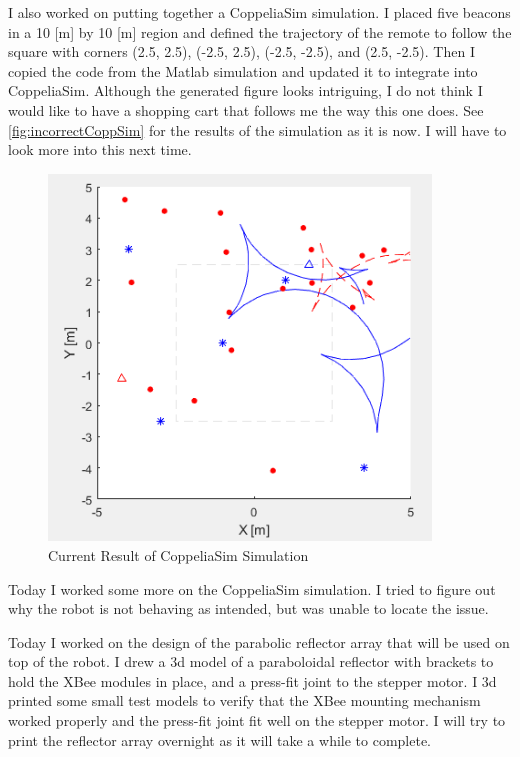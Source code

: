 \documentclass[fontsize=11pt, %
                             paper=letter, %
                             openany, %
                             captions=tableheading,
                             index=totoc,
                             hyperref]{labbook}
\begin{document}
\begin{addmargin}[0cm]{0cm}
I also worked on putting together a CoppeliaSim simulation. I placed five beacons in a 10 [m] by 10 [m] region and defined the trajectory of the remote to follow the square with corners (2.5, 2.5), (-2.5, 2.5), (-2.5, -2.5), and (2.5, -2.5). Then I copied the code from the Matlab simulation and updated it to integrate into CoppeliaSim. Although the generated figure looks intriguing, I do not think I would like to have a shopping cart that follows me the way this one does. See \autoref{fig:incorrectCoppSim} for the results of the simulation as it is now. I will have to look more into this next time.

\begin{figure}[h!]
    \center
    \includegraphics[width=4in]{figs/img/incorrectCoppeliaSimSimulation.png}
    \caption{Current Result of CoppeliaSim Simulation}
    \label{fig:incorrectCoppSim}
\end{figure}


%
Today I worked some more on the CoppeliaSim simulation. I tried to figure out why the robot is not behaving as intended, but was unable to locate the issue.


%
Today I worked on the design of the parabolic reflector array that will be used on top of the robot. I drew a 3d model of a paraboloidal reflector with brackets to hold the XBee modules in place, and a press-fit joint to the stepper motor. I 3d printed some small test models to verify that the XBee mounting mechanism worked properly and the press-fit joint fit well on the stepper motor. I will try to print the reflector array overnight as it will take a while to complete.


\end{addmargin}
\end{document}
